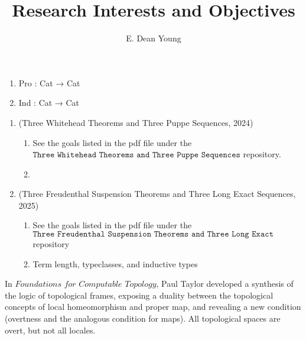 \documentclass{book}
\title{Research Interests and Objectives}
\author{E. Dean Young}
\begin{document}
\maketitle


\begin{center}
\scalebox{1.3}{\bf Stage 0: (Category Theory)}
\end{center}

\begin{enumerate}
\item Pro : Cat → Cat
\item Ind : Cat → Cat
\end{enumerate}

\newpage
\begin{center}
\end{center}

\begin{enumerate}
\item (Three Whitehead Theorems and Three Puppe Sequences, 2024)
\begin{enumerate}
\item See the goals listed in the pdf file under the $\texttt{Three Whitehead Theorems and Three Puppe Sequences}$ repository.
\item 
\end{enumerate}
\item (Three Freudenthal Suspension Theorems and Three Long Exact Sequences, 2025)
\begin{enumerate}
\item See the goals listed in the pdf file under the $\texttt{Three Freudenthal Suspension Theorems and Three Long Exact Sequences}$ repository 
\item Term length, typeclasses, and inductive types
\end{enumerate}
\end{enumerate}

\newpage
\begin{center}
\end{center}


In $\textit{Foundations for Computable Topology}$, Paul Taylor developed a synthesis of the logic of topological frames, exposing a duality between the topological concepts of local homeomorphism and proper map, and revealing a new condition (overtness and the analogous condition for maps). All topological spaces are overt, but not all locales.\\
\end{document}
